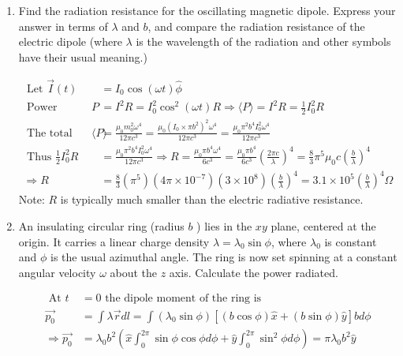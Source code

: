 \begin{enumerate}
\begin{answer}
	\end{answer}
	\item Find the radiation resistance for the oscillating magnetic dipole. Express your answer in terms of $\lambda$ and $b$, and compare the radiation resistance of the electric dipole (where $\lambda$ is the wavelength of the radiation and other symbols have their usual meaning.)
	\begin{answer}
		\begin{align*}
		\text { Let } \vec{I}(t)&=I_{0} \cos (\omega t) \hat{\phi}\\
		\text { Power radiated } P&=I^{2} R=I_{0}^{2} \cos ^{2}(\omega t) R \Rightarrow\langle P\rangle=I^{2} R=\frac{1}{2} I_{0}^{2} R\\
		\text { The total power radiated is }\langle P\rangle&=\frac{\mu_{0} m_{0}^{2} \omega^{4}}{12 \pi c^{3}}=\frac{\mu_{0}\left(I_{0} \times \pi b^{2}\right)^{2} \omega^{4}}{12 \pi c^{3}}=\frac{\mu_{0} \pi^{2} b^{4} I_{0}^{2} \omega^{4}}{12 \pi c^{3}}\\
		\text { Thus } \frac{1}{2} I_{0}^{2} R&=\frac{\mu_{0} \pi^{2} b^{4} I_{0}^{2} \omega^{4}}{12 \pi c^{3}} \Rightarrow R=\frac{\mu_{0} \pi b^{4} \omega^{4}}{6 c^{3}}=\frac{\mu_{0} \pi b^{4}}{6 c^{3}}\left(\frac{2 \pi c}{\lambda}\right)^{4}=\frac{8}{3} \pi^{5} \mu_{0} c\left(\frac{b}{\lambda}\right)^{4}\\
		\Rightarrow R&=\frac{8}{3}\left(\pi^{5}\right)\left(4 \pi \times 10^{-7}\right)\left(3 \times 10^{8}\right)\left(\frac{b}{\lambda}\right)^{4}=3.1 \times 10^{5}\left(\frac{b}{\lambda}\right)^{4} \Omega
		\end{align*}
		Note: $R$ is typically much smaller than the electric radiative resistance.
	\end{answer}
	\item An insulating circular ring (radius $b$ ) lies in the $x y$ plane, centered at the origin. It carries a linear charge density $\lambda=\lambda_{0} \sin \phi$, where $\lambda_{0}$ is constant and $\phi$ is the usual azimuthal angle. The ring is now set spinning at a constant angular velocity $\omega$ about the $z$ axis. Calculate the power radiated.
	\begin{answer}
		\begin{align*}
		\text { At } t&=0 \text { the dipole moment of the ring is }\\
		\overrightarrow{p_{0}}&=\int \lambda \vec{r} d l=\int\left(\lambda_{0} \sin \phi\right)[(b \cos \phi) \hat{x}+(b \sin \phi) \hat{y}] b d \phi\\
		\Rightarrow \overrightarrow{p_{0}}&=\lambda_{0} b^{2}\left(\hat{x} \int_{0}^{2 \pi} \sin \phi \cos \phi d \phi+\hat{y} \int_{0}^{2 \pi} \sin ^{2} \phi d \phi\right)=\pi \lambda_{0} b^{2} \hat{y}\\

\end{align*}
\end{answer}
\end{enumerate}
